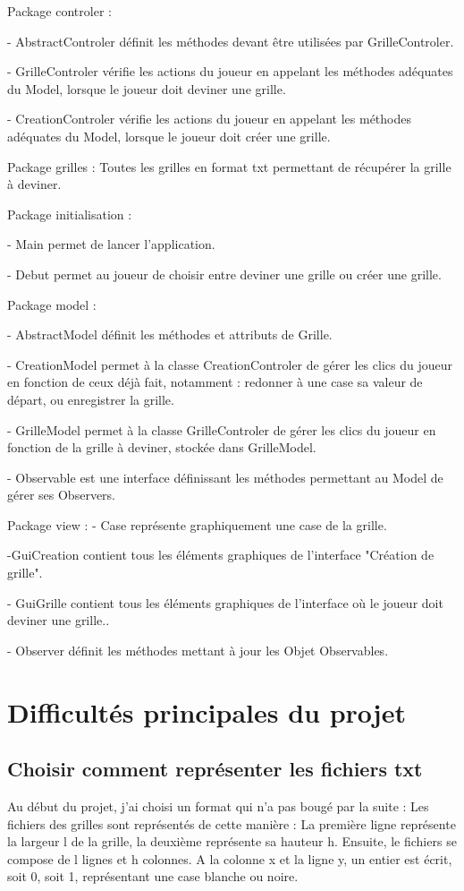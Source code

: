 \documentclass{report}
\begin{document}
\medbreak
Package controler :

- AbstractControler définit les méthodes devant être utilisées par GrilleControler.

- GrilleControler vérifie les actions du joueur en appelant les méthodes adéquates du Model, lorsque le joueur doit deviner une grille.

- CreationControler vérifie les actions du joueur en appelant les méthodes adéquates du Model, lorsque le joueur doit créer une grille.

\medbreak
Package grilles :
Toutes les grilles en format txt permettant de récupérer la grille à deviner.

\medbreak
Package initialisation :

- Main permet de lancer l'application.

- Debut permet au joueur de choisir entre deviner une grille ou créer une grille.

\medbreak
Package model :

- AbstractModel définit les méthodes et attributs de Grille.

- CreationModel permet à la classe CreationControler de gérer les clics du joueur en fonction de ceux déjà fait, notamment : redonner à une case sa valeur de départ, ou enregistrer la grille.

- GrilleModel permet à la classe GrilleControler de gérer les clics du joueur en fonction de la grille à deviner, stockée dans GrilleModel.

- Observable est une interface définissant les méthodes permettant au Model de gérer ses Observers. 

\medbreak
Package view :
- Case représente graphiquement une case de la grille.

-GuiCreation contient tous les éléments graphiques de l'interface "Création de grille".

- GuiGrille contient tous les éléments graphiques de l'interface où le joueur doit deviner une grille..

- Observer définit les méthodes mettant à jour les Objet Observables.

\chapter{Difficultés principales du projet}
\section{Choisir comment représenter les fichiers txt}
Au début du projet, j'ai choisi un format qui n'a pas bougé par la suite : Les fichiers des grilles sont représentés de cette manière : La première ligne représente la largeur l de la grille, la deuxième représente sa hauteur h. Ensuite, le fichiers se compose de l lignes et h colonnes. A la colonne x et la ligne y, un entier est écrit, soit 0, soit 1, représentant une case blanche ou noire.
\end{document}
